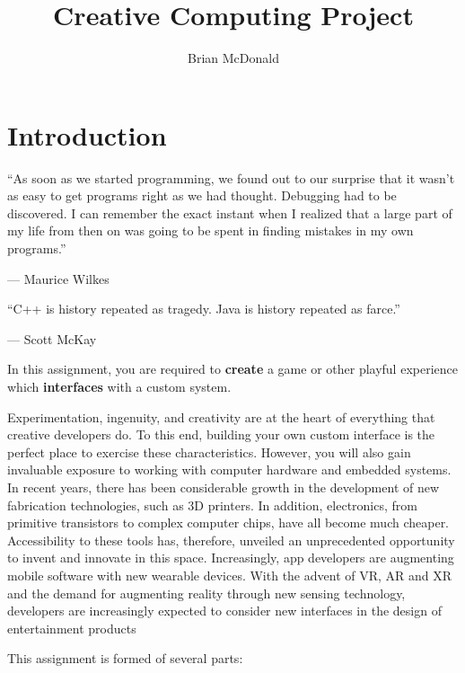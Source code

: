 \documentclass{../../fal_assignment}
\title{Creative Computing Project}
\author{Brian McDonald}
\begin{document}
	
	\maketitle
	
	\section*{Introduction}
	
	\begin{marginquote}
		``As soon as we started programming, we found out to our surprise that it 
		wasn't as easy to get programs right as we had thought. 
		Debugging had to be discovered. I can remember the exact instant when 
		I realized that a large part of my life from then on was going to be spent 
		in finding mistakes in my own programs.''
		\par --- Maurice Wilkes
		\marginquoterule
		\par ``C++ is history repeated as tragedy. Java is history repeated as farce.''
		\par --- Scott McKay
	\end{marginquote}
	
	In this assignment, you are required to \textbf{create} a game or other playful experience 
	which \textbf{interfaces} with a custom system.
	
	Experimentation, ingenuity, and creativity are at the heart of everything that 
	creative developers do. To this end, building your own custom interface is the perfect 
	place to exercise these characteristics. However, you will also gain invaluable exposure to 
	working with computer hardware and embedded systems. In recent years, there has been considerable growth in the 
	development of new fabrication technologies, such as 3D printers. In addition, electronics, 
	from primitive transistors to complex computer chips, have all become much cheaper. Accessibility 
	to these tools has, therefore, unveiled an unprecedented opportunity to invent and innovate 
	in this space. Increasingly, app developers are augmenting mobile software with new wearable 
	devices. With the advent of VR, AR and XR and the demand for augmenting reality through new sensing technology, developers are increasingly expected to consider new interfaces in the design of entertainment products
	
	This assignment is formed of several parts:
	
\end{document}
